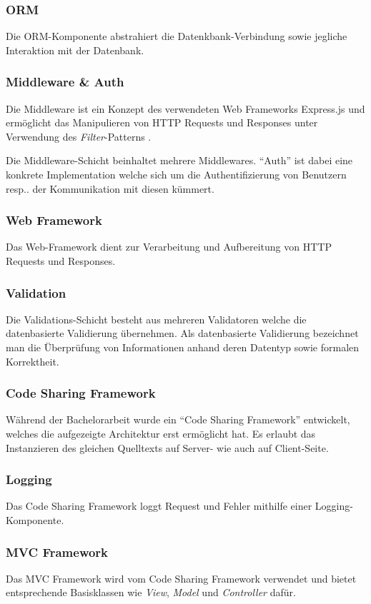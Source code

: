 \subsubsection*{ORM}
Die ORM-Komponente abstrahiert die Datenkbank-Verbindung sowie jegliche Interaktion mit der Datenbank.

\subsubsection*{\gls{Middleware} \& Auth}
Die \gls{Middleware} ist ein Konzept des verwendeten Web Frameworks Express.js \cite{Expressjs} und ermöglicht das Manipulieren von HTTP Requests und Responses unter Verwendung des \emph{Filter}-Patterns \cite{POSA2}.

Die Middleware-Schicht beinhaltet mehrere Middlewares. ``Auth'' ist dabei eine konkrete Implementation welche sich um die Authentifizierung von Benutzern resp.. der Kommunikation mit diesen kümmert.

\subsubsection*{Web Framework}
Das Web-Framework dient zur Verarbeitung und Aufbereitung von HTTP Requests und Responses.

\subsubsection*{Validation}
Die Validations-Schicht besteht aus mehreren Validatoren welche die datenbasierte Validierung übernehmen. Als datenbasierte Validierung bezeichnet man die Überprüfung von Informationen anhand deren Datentyp sowie formalen Korrektheit.

\subsubsection*{Code Sharing Framework}
Während der Bachelorarbeit wurde ein ``Code Sharing Framework'' entwickelt, welches die aufgezeigte Architektur erst ermöglicht hat. Es erlaubt das Instanzieren des gleichen Quelltexts auf Server- wie auch auf Client-Seite.

\subsubsection*{Logging}
Das Code Sharing Framework loggt Request und Fehler mithilfe einer Logging-Komponente.

\subsubsection*{MVC Framework}
Das MVC Framework wird vom Code Sharing Framework verwendet und bietet entsprechende Basisklassen wie \emph{View}, \emph{Model} und \emph{Controller} dafür.

